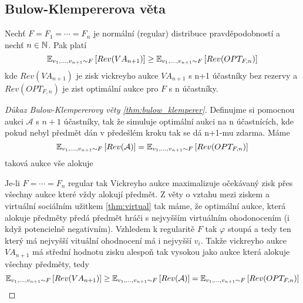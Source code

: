\subsection{Bulow-Klempererova věta}

\begin{theorem}
\label{thm:bulow_klemperer}
Nechť $F = F_1 = \cdots = F_n$ je normální (regular) distribuce pravděpodobností a nechť $n \in \N$. 
Pak platí 
\[
    \E[v_1,\dots,v_{n+1}\sim F]{Rev(VA_{n+1})} \geq \E[v_1,\dots,v_{n+1}\sim F]{Rev(OPT_{F,n})} 
\]
kde $Rev(VA_{n+1})$ je zisk vickreyho aukce $VA_{n+1}$ s n+1 účastníky bez rezervy a $Rev(OPT_{F,n})$ je zist optimální aukce pro $F$ s n účastníky. 
\end{theorem}
\begin{proof}[Důkaz Bulow-Klempererovy věty \ref{thm:bulow_klemperer}]
    Definujme si pomocnou aukci $\mathcal{A}$ s $n+1$ účastníky, tak že simuluje optimální aukci na n účastnících, kde pokud nebyl předmět dán v předešlém kroku tak se dá n+1-mu zdarma. 
    Máme 
    \[
        \E[v_1,\dots,v_{n+1}\sim F]{Rev(\mathcal{A})} = \E[v_1,\dots,v_{n+1}\sim F]{Rev(OPT_{F,n})}
    \]
    taková aukce vše alokuje

    Je-li $F=\cdots=F_n$ regular tak Vickreyho aukce maximalizuje očekávaný zisk přes všechny aukce které vždy alokují předmět. 
    Z věty o vztahu mezi ziskem a virtuální sociálním užitkem \ref{thm:virtual} tak máme, že optimální aukce, která alokuje předměty předá předmět hráči s nejvyšším virtuálním ohodonocením (i když potencielně negativním). 
    Vzhledem k regularitě $F$ tak $\varphi$ stoupá a tedy ten který má nejvyšší vituální ohodnocení má i nejvyšší $v_i$. 
    Takže vickreyho aukce $VA_{n+1}$ má střední hodnotu zisku alespoň tak vysokou jako  aukce která alokuje všechny předměty, tedy 
    \[
        \E[v_1,\dots,v_{n+1}\sim F]{Rev(VA_{n+1})} \geq \E[v_1,\dots,v_{n+1}\sim F]{Rev(\mathcal{A})} = \E[v_1,\dots,v_{n+1}\sim F]{Rev(OPT_{F,n})}
    \]
\end{proof}


